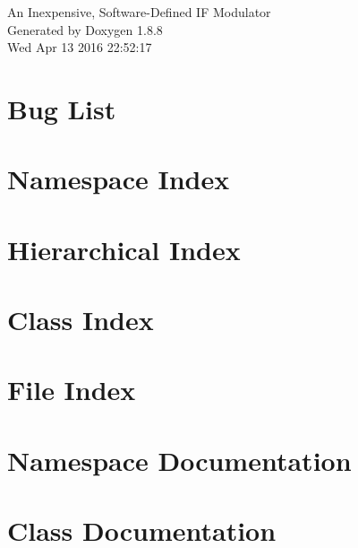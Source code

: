 \documentclass[twoside]{book}
\newcommand{\+}{\discretionary{\mbox{\scriptsize$\hookleftarrow$}}{}{}}
\newcommand{\clearemptydoublepage}{%
  \newpage{\pagestyle{empty}\cleardoublepage}%
}
\begin{document}
\hypersetup{pageanchor=false,
             bookmarks=true,
             bookmarksnumbered=true,
             pdfencoding=unicode
            }
\begin{titlepage}
\vspace*{7cm}
\begin{center}%
{\Large An Inexpensive, Software-\/\+Defined I\+F Modulator }\\
\vspace*{1cm}
{\large Generated by Doxygen 1.8.8}\\
\vspace*{0.5cm}
{\small Wed Apr 13 2016 22:52:17}\\
\end{center}
\end{titlepage}
\clearemptydoublepage
\tableofcontents
\clearemptydoublepage
{}
\hypersetup{pageanchor=true}

\chapter{Bug List}
\label{bug}
\hypertarget{bug}{}

\chapter{Namespace Index}

\chapter{Hierarchical Index}

\chapter{Class Index}

\chapter{File Index}

\chapter{Namespace Documentation}

\chapter{Class Documentation}





\end{document}
